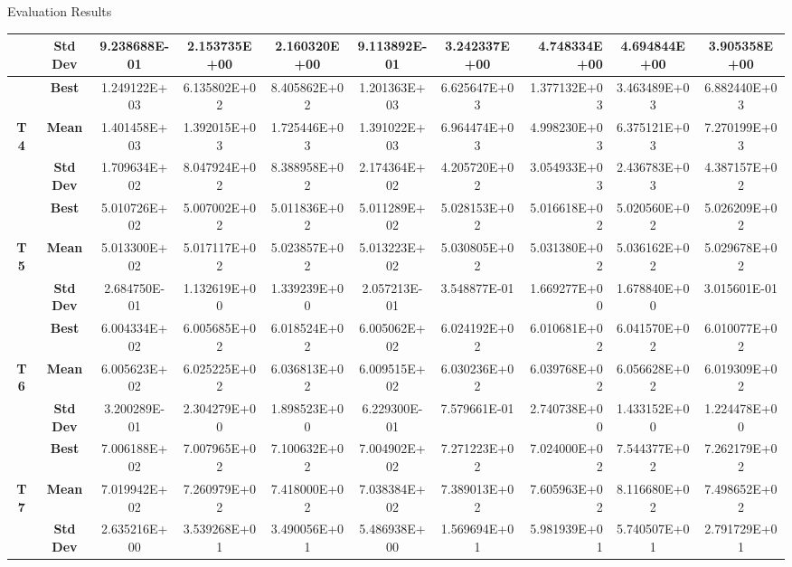 \documentclass[table]{beamer}
\begin{document}
\begin{frame}{Evaluation Results}
\begin{table}[htbp]
{\begin{tabular}{|c|c|c|c|c|c|c|r|c|c|}
		\multicolumn{ 1}{|c|}{} & \textbf{Std Dev} & 9.238688E-01 & 2.153735E+00 & 2.160320E+00 & 9.113892E-01 & 3.242337E+00 & 4.748334E+00 & 4.694844E+00 & 3.905358E+00 \\ \hline
		\multicolumn{ 1}{|c|}{} & \textbf{Best} & 1.249122E+03 & 6.135802E+02 & 8.405862E+02 & 1.201363E+03 & 6.625647E+03 & 1.377132E+03 & 3.463489E+03 & 6.882440E+03 \\ \cline{ 2- 10}
		\multicolumn{ 1}{|c|}{\textbf{T4}} & \textbf{Mean} & 1.401458E+03 & 1.392015E+03 & 1.725446E+03 & 1.391022E+03 & 6.964474E+03 & 4.998230E+03 & 6.375121E+03 & 7.270199E+03 \\ \cline{ 2- 10}
		\multicolumn{ 1}{|c|}{} & \textbf{Std Dev} & 1.709634E+02 & 8.047924E+02 & 8.388958E+02 & 2.174364E+02 & 4.205720E+02 & 3.054933E+03 & 2.436783E+03 & 4.387157E+02 \\ \hline
		\multicolumn{ 1}{|c|}{} & \textbf{Best} & 5.010726E+02 & 5.007002E+02 & 5.011836E+02 & 5.011289E+02 & 5.028153E+02 & 5.016618E+02 & 5.020560E+02 & 5.026209E+02 \\ \cline{ 2- 10}
		\multicolumn{ 1}{|c|}{\textbf{T5}} & \textbf{Mean} & 5.013300E+02 & 5.017117E+02 & 5.023857E+02 & 5.013223E+02 & 5.030805E+02 & 5.031380E+02 & 5.036162E+02 & 5.029678E+02 \\ \cline{ 2- 10}
		\multicolumn{ 1}{|c|}{} & \textbf{Std Dev} & 2.684750E-01 & 1.132619E+00 & 1.339239E+00 & 2.057213E-01 & 3.548877E-01 & 1.669277E+00 & 1.678840E+00 & 3.015601E-01 \\ \hline
		\multicolumn{ 1}{|c|}{} & \textbf{Best} & 6.004334E+02 & 6.005685E+02 & 6.018524E+02 & 6.005062E+02 & 6.024192E+02 & 6.010681E+02 & 6.041570E+02 & 6.010077E+02 \\ \cline{ 2- 10}
		\multicolumn{ 1}{|c|}{\textbf{T6}} & \textbf{Mean} & 6.005623E+02 & 6.025225E+02 & 6.036813E+02 & 6.009515E+02 & 6.030236E+02 & 6.039768E+02 & 6.056628E+02 & 6.019309E+02 \\ \cline{ 2- 10}
		\multicolumn{ 1}{|c|}{} & \textbf{Std Dev} & 3.200289E-01 & 2.304279E+00 & 1.898523E+00 & 6.229300E-01 & 7.579661E-01 & 2.740738E+00 & 1.433152E+00 & 1.224478E+00 \\ \hline
		\multicolumn{ 1}{|c|}{} & \textbf{Best} & 7.006188E+02 & 7.007965E+02 & 7.100632E+02 & 7.004902E+02 & 7.271223E+02 & 7.024000E+02 & 7.544377E+02 & 7.262179E+02 \\ \cline{ 2- 10}
		\multicolumn{ 1}{|c|}{\textbf{T7}} & \textbf{Mean} & 7.019942E+02 & 7.260979E+02 & 7.418000E+02 & 7.038384E+02 & 7.389013E+02 & 7.605963E+02 & 8.116680E+02 & 7.498652E+02 \\ \cline{ 2- 10}
		\multicolumn{ 1}{|c|}{} & \textbf{Std Dev} & 2.635216E+00 & 3.539268E+01 & 3.490056E+01 & 5.486938E+00 & 1.569694E+01 & 5.981939E+01 & 5.740507E+01 & 2.791729E+01 \\ \hline
	\end{tabular}}
	\label{}
\end{table}

	\end{frame}
\end{document}
